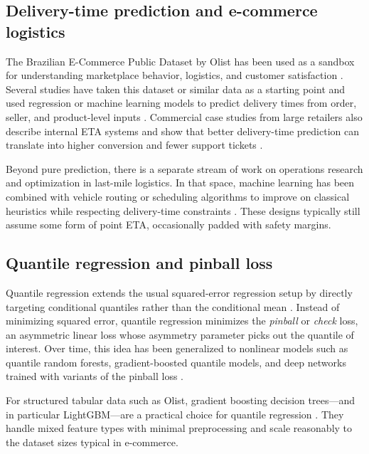 \documentclass[10pt,twocolumn]{article}
\begin{document}
\subsection{Delivery-time prediction and e-commerce logistics}
The Brazilian E-Commerce Public Dataset by Olist has been used as a sandbox for understanding marketplace behavior, logistics, and customer satisfaction \citep{olistdataset}. Several studies have taken this dataset or similar data as a starting point and used regression or machine learning models to predict delivery times from order, seller, and product-level inputs \citep{brunilogistics2023,rokoss2024deliverytime}. Commercial case studies from large retailers also describe internal ETA systems and show that better delivery-time prediction can translate into higher conversion and fewer support tickets \citep{walmart2019cdt,kardinal2025lastmile}.

Beyond pure prediction, there is a separate stream of work on operations research and optimization in last-mile logistics. In that space, machine learning has been combined with vehicle routing or scheduling algorithms to improve on classical heuristics while respecting delivery-time constraints \citep{brunilogistics2023}. These designs typically still assume some form of point ETA, occasionally padded with safety margins.

\subsection{Quantile regression and pinball loss}
Quantile regression extends the usual squared-error regression setup by directly targeting conditional quantiles rather than the conditional mean \citep{koenker1978,koenker2001}. Instead of minimizing squared error, quantile regression minimizes the \emph{pinball} or \emph{check} loss, an asymmetric linear loss whose asymmetry parameter picks out the quantile of interest. Over time, this idea has been generalized to nonlinear models such as quantile random forests, gradient-boosted quantile models, and deep networks trained with variants of the pinball loss \citep{biau2024pinball,tagasovska2019epinball}.

For structured tabular data such as Olist, gradient boosting decision trees---and in particular LightGBM---are a practical choice for quantile regression \citep{lightgbm2017}. They handle mixed feature types with minimal preprocessing and scale reasonably to the dataset sizes typical in e-commerce.
\end{document}
